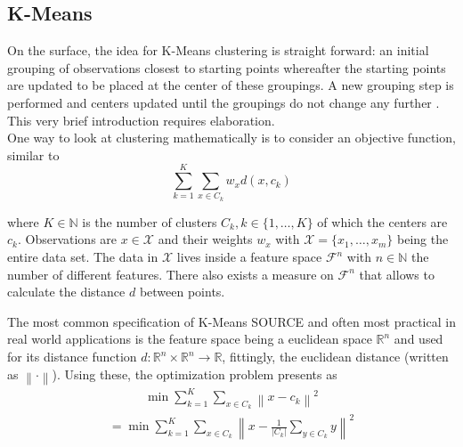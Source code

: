 \subsection{K-Means}
\label{subsec:method_kmeans}
On the surface, the idea for K-Means clustering is straight forward: an initial grouping of observations closest to starting points whereafter the starting points are updated to be placed at the center of these groupings. A new grouping step is performed and centers updated until the groupings do not change any further \cite{wiedenbeck2001klassifikation, fahrmeir2015multivariate}. This very brief introduction requires elaboration.\\

One way to look at clustering mathematically is to consider an objective function, similar to \cite{wu2012advances}
\begin{equation}
    \sum_{k=1}^{K}\sum_{x \in C_{k}}^{} w_{x}d(x, c_{k})
\end{equation}

where $K \in \mathbb{N}$ is the number of clusters $C_{k}, k \in \{ 1,\dots,K \}$ of which the centers are $c_{k}$. Observations are $x \in \mathcal{X}$ and their weights $w_{x}$ with $\mathcal{X} = \{ x_{1}, \dots, x_{m} \}$ being the entire data set. The data in $\mathcal{X}$ lives inside a feature space $\mathcal{F}^{n}$ with $n \in \mathbb{N}$ the number of different features. There also exists a measure on $\mathcal{F}^{n}$ that allows to calculate the distance $d$ between points. 

The most common specification of K-Means SOURCE and often most practical in real world applications is the feature space being a euclidean space $\mathbb{R}^{n}$ and used for its distance function $d: \mathbb{R}^{n} \times \mathbb{R}^{n} \rightarrow \mathbb{R}$, fittingly, the euclidean distance (written as $\left \| \cdot \right \|$). Using these, the optimization problem presents as
\begin{equation}
\begin{gathered}
    \min \sum_{k=1}^{K}\sum_{x \in C_{k}}^{} \left \| x - c_{k} \right \|^2
\end{gathered}\label{eqn:kmeans_basic}
\end{equation}
\begin{equation}
\begin{gathered}
    = \min \sum_{k=1}^{K}\sum_{x \in C_{k}}^{} \left \| x - \frac{1}{\left | C_{k} \right |} \sum_{y \in C_{k}}^{} y  \right \|^2
\end{gathered}\label{eq:kmeans_basic_other}
\end{equation}

